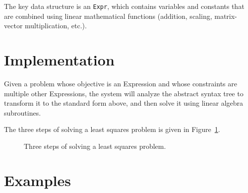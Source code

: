 \documentclass[12pt]{article}
\begin{document}
The key data structure is an \verb|Expr|, which contains variables and constants
that are combined using linear mathematical functions (addition, scaling,
matrix-vector multiplication, etc.).

\section{Implementation}

Given a problem whose objective is an Expression and whose constraints are
multiple other Expressions, the system will analyze the abstract syntax tree to
transform it to the standard form above, and then solve it using linear algebra
subroutines.

The three steps of solving a least squares problem is given in Figure~\ref{fig:steps}.
\begin{figure}[!ht]
  \centering
  \caption{Three steps of solving a least squares problem.}
  \label{fig:steps}
\end{figure}

\section{Examples}
\end{document}
